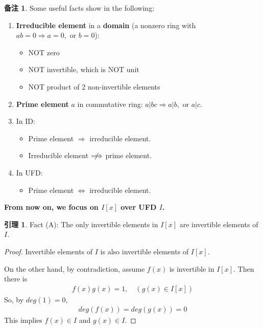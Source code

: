 \documentclass[utf8]{ctexbook}
\theoremstyle{definition}
\newtheorem{memo}{备注}[section]
\newtheorem{lemma}{引理}[section]
\begin{document}
\begin{memo}
Some useful facts show in the following:
\begin{enumerate}
\item{\textbf{Irreducible element} in a \textbf{domain} (a nonzero ring with $ab = 0 \Longrightarrow a=0, \mbox{ or } b =0$):
\begin{itemize}
\item{NOT zero}
\item{NOT invertible, which is NOT unit}
\item{NOT product of 2 non-invertible elements}
\end{itemize}
}
\item{\textbf{Prime element} $a$ in commutative ring: $ a | bc \Longrightarrow a | b, \mbox{ or } a | c $.
}
\item{In ID: 
\begin{itemize}
\item{Prime element $\Longrightarrow$ irreducible element.}
\item{Irreducible element $ \centernot \Longrightarrow$ prime element.}
\end{itemize}
}
\item{In UFD:
\begin{itemize}
\item{Prime element $\iff$ irreducible element.}
\end{itemize}
}
\end{enumerate}

\end{memo}


\textbf{From now on, we focus on $I[x]$ over UFD $I$.}


\begin{lemma}\label{lemma_poly_ring_factor_fact_A}
Fact (A): The only invertible elements in $I[x]$ are invertible elements of $I$.
\end{lemma}

\begin{proof}
Invertible elements of $I$ is also invertible elements of $I[x]$.

On the other hand, by contradiction, assume $f(x)$ is invertible in $I[x]$. Then there is 
\begin{align*}
f(x) g(x) = 1 , \quad (g(x) \in I[x])
\end{align*}
So, by $deg(1) = 0$,
\begin{align*}
deg(f(x)) = deg(g(x)) = 0
\end{align*}
This implies $f(x) \in I$ and $g(x) \in I$.

\end{proof}
\end{document}

